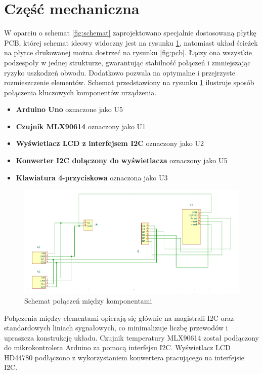 \section*{Część mechaniczna}

W oparciu o schemat \ref{fig:schemat} zaprojektowano specjalnie dostosowaną płytkę PCB, której schemat ideowy widoczny jest na rysunku \ref{fig:cad}, natomiast układ ścieżek na płytce drukowanej można dostrzeć na rysunku \ref{fig:pcb}. Łączy ona wszystkie podzespoły w jednej strukturze, gwarantując stabilność połączeń i zmniejszając ryzyko uszkodzeń obwodu. Dodatkowo pozwala na optymalne i przejrzyste rozmieszczenie elementów. Schemat przedstawiony na rysunku \ref{fig:cad} ilustruje sposób połączenia kluczowych komponentów urządzenia.  

\begin{itemize}
    \item \textbf{Arduino Uno} oznaczone jako U5
    \item \textbf{Czujnik MLX90614} oznaczony jako U1
    \item \textbf{Wyświetlacz LCD z interfejsem I2C} oznaczony jako U2 
    \item \textbf{Konwerter I2C dołączony do wyświetlacza} oznaczony jako U5 
    \item \textbf{Klawiatura 4-przyciskowa} oznaczona jako U3
\end{itemize}

\begin{figure}[h!]
    \centering
    \includegraphics[width=1.1\textwidth]{images/cad.png}
    \caption{Schemat połączeń między komponentami}
    \label{fig:cad}
\end{figure}

Połączenia między elementami opierają się głównie na magistrali I2C oraz standardowych liniach sygnałowych, co minimalizuje liczbę przewodów i upraszcza konstrukcję układu.
Czujnik temperatury MLX90614 został podłączony do mikrokontrolera Arduino za pomocą interfejsu I2C. Wyświetlacz LCD HD44780 podłączono z wykorzystaniem konwertera pracującego na interfejsie I2C.%

